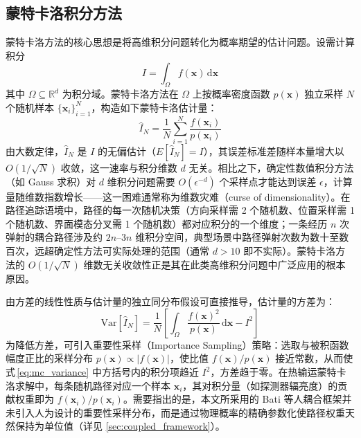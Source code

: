 \subsection{蒙特卡洛积分方法}

蒙特卡洛方法的核心思想是将高维积分问题转化为概率期望的估计问题。设需计算积分
\begin{equation}
    I = \int_\Omega f(\mathbf{x}) \, \mathrm{d}\mathbf{x}
    \label{eq:mc_integral}
\end{equation}
其中 $\Omega \subseteq \mathbb{R}^d$ 为积分域。蒙特卡洛方法在 $\Omega$ 上按概率密度函数 $p(\mathbf{x})$ 独立采样 $N$ 个随机样本 $\{\mathbf{x}_i\}_{i=1}^N$，构造如下蒙特卡洛估计量：
\begin{equation}
    \hat{I}_N = \frac{1}{N} \sum_{i=1}^{N} \frac{f(\mathbf{x}_i)}{p(\mathbf{x}_i)}
    \label{eq:mc_estimator}
\end{equation}
由大数定律，$\hat{I}_N$ 是 $I$ 的无偏估计（$E[\hat{I}_N] = I$），其误差标准差随样本量增大以 $O(1/\sqrt{N})$ 收敛，这一速率与积分维数 $d$ 无关。相比之下，确定性数值积分方法（如 Gauss 求积\cite{modestRadiativeHeatTransfer2013}）对 $d$ 维积分问题需要 $O(\epsilon^{-d})$ 个采样点才能达到误差 $\epsilon$，计算量随维数指数增长——这一困难通常称为维数灾难（curse of dimensionality）。在路径追踪语境中，路径的每一次随机决策（方向采样需 2 个随机数、位置采样需 1 个随机数、界面模态分叉需 1 个随机数）都对应积分的一个维度；一条经历 $n$ 次弹射的耦合路径涉及约 $2n$--$3n$ 维积分空间，典型场景中路径弹射次数为数十至数百次，远超确定性方法可实际处理的范围（通常 $d > 10$ 即不实际）。蒙特卡洛方法的 $O(1/\sqrt{N})$ 维数无关收敛性正是其在此类高维积分问题中广泛应用的根本原因。

由方差的线性性质与估计量的独立同分布假设可直接推导\cite{modestRadiativeHeatTransfer2013}，估计量的方差为：
\begin{equation}
    \mathrm{Var}[\hat{I}_N] = \frac{1}{N} \left[ \int_\Omega \frac{f(\mathbf{x})^2}{p(\mathbf{x})} \, \mathrm{d}\mathbf{x} - I^2 \right]
    \label{eq:mc_variance}
\end{equation}
为降低方差，可引入重要性采样（Importance Sampling）策略：选取与被积函数幅度正比的采样分布 $p(\mathbf{x}) \propto |f(\mathbf{x})|$，使比值 $f(\mathbf{x})/p(\mathbf{x})$ 接近常数，从而使式\,\eqref{eq:mc_variance} 中方括号内的积分项趋近 $I^2$，方差趋于零。在热输运蒙特卡洛求解中，每条随机路径对应一个样本 $\mathbf{x}_i$，其对积分量（如探测器辐亮度）的贡献权重即为 $f(\mathbf{x}_i)/p(\mathbf{x}_i)$。需要指出的是，本文所采用的 Bati 等人耦合框架并未引入人为设计的重要性采样分布\cite{batiCouplingConductionConvection2023}，而是通过物理概率的精确参数化使路径权重天然保持为单位值（详见 \ref{sec:coupled_framework}）。


